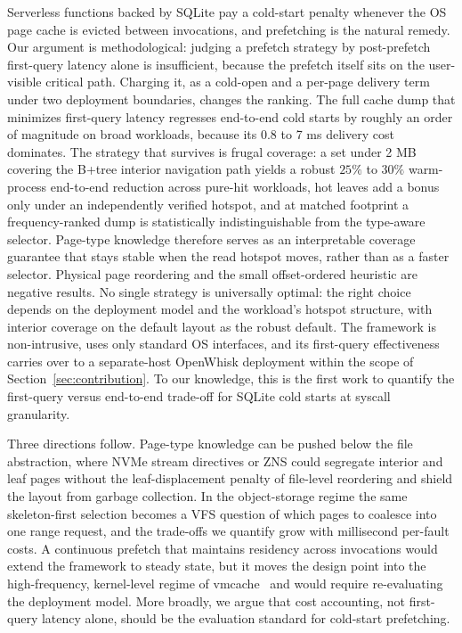 \documentclass[sigconf, nonacm]{acmart}
\begin{document}
Serverless functions backed by SQLite pay a cold-start penalty whenever the OS page cache is evicted between invocations, and prefetching is the natural remedy. Our argument is methodological: judging a prefetch strategy by post-prefetch first-query latency alone is insufficient, because the prefetch itself sits on the user-visible critical path. Charging it, as a cold-open and a per-page delivery term under two deployment boundaries, changes the ranking. The full cache dump that minimizes first-query latency regresses end-to-end cold starts by roughly an order of magnitude on broad workloads, because its 0.8 to 7 ms delivery cost dominates. The strategy that survives is frugal coverage: a set under 2 MB covering the B+tree interior navigation path yields a robust $25\%$ to $30\%$ warm-process end-to-end reduction across pure-hit workloads, hot leaves add a bonus only under an independently verified hotspot, and at matched footprint a frequency-ranked dump is statistically indistinguishable from the type-aware selector. Page-type knowledge therefore serves as an interpretable coverage guarantee that stays stable when the read hotspot moves, rather than as a faster selector. Physical page reordering and the small offset-ordered heuristic are negative results. No single strategy is universally optimal: the right choice depends on the deployment model and the workload's hotspot structure, with interior coverage on the default layout as the robust default. The framework is non-intrusive, uses only standard OS interfaces, and its first-query effectiveness carries over to a separate-host OpenWhisk deployment within the scope of Section~\ref{sec:contribution}. To our knowledge, this is the first work to quantify the first-query versus end-to-end trade-off for SQLite cold starts at syscall granularity.

Three directions follow. Page-type knowledge can be pushed below the file abstraction, where NVMe stream directives or ZNS could segregate interior and leaf pages without the leaf-displacement penalty of file-level reordering and shield the layout from garbage collection. In the object-storage regime the same skeleton-first selection becomes a VFS question of which pages to coalesce into one range request, and the trade-offs we quantify grow with millisecond per-fault costs. A continuous prefetch that maintains residency across invocations would extend the framework to steady state, but it moves the design point into the high-frequency, kernel-level regime of vmcache~\cite{Leis2023} and would require re-evaluating the deployment model. More broadly, we argue that cost accounting, not first-query latency alone, should be the evaluation standard for cold-start prefetching.




\end{document}
